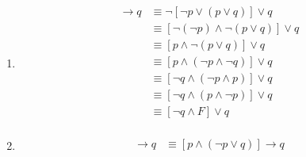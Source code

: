 \documentclass[12pt letter]{report}
\begin{document}
{\begin{enumerate}
\begin{align*}
		      \end{align*}
		\item \begin{align*}
			      [\neg p \vee \left( p \vee q \right) ] \to q & \equiv \neg \left[ \neg  p \vee \left( p \vee q \right)
			      \right] \vee  q \tag*{Conditional Disjunction Equivalence}                                                                      \\
			                                                   & \equiv \left[ \neg \left( \neg p \right) \wedge \neg
				      \left( p \vee q \right)   \right] \vee  q \tag*{By the Second De
			      Morgan's Law}                                                                                                                   \\
			                                                   & \equiv \left[ p \wedge \neg \left( p \vee q \right)
			      \right]  \vee q \tag*{By the Double Negation Law}                                                                               \\
			                                                   & \equiv \left[ p \wedge \left( \neg p \wedge \neg q
			      \right)   \right] \vee q \tag*{By the Second De Morgan's Law}                                                                   \\
			                                                   & \equiv \left[ \neg q \wedge \left( \neg p \wedge p
				      \right)   \right] \vee q \tag*{By the Second Associative
			      Law}                                                                                                                            \\
			                                                   & \equiv \left[ \neg q \wedge \left( p \wedge \neg p
				      \right)   \right] \vee q \tag*{By the Second Commutative
			      Law}                                                                                                                            \\
			                                                   & \equiv \left[ \neg q \wedge F  \right] \vee  q \tag*{By the Second Negation Law} \\
		      \end{align*}
		\item
		      \begin{align*}
			      [p \wedge \left( p \to q \right) ] \to q & \equiv [p \wedge \left( \neg p \vee q \right) ] \to q
			      \tag*{Conditional Disjunction Equivalence}                                                                                               \\

\end{align*}
\end{enumerate}}
\end{document}
